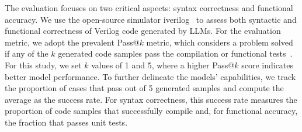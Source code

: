 The evaluation focuses on two critical aspects: syntax correctness and functional accuracy. We use the open-source simulator iverilog~\citep{williams2002icarus} to assess both syntactic and functional correctness of Verilog code generated by LLMs. 
For the evaluation metric, we adopt the prevalent Pass@$k$ metric, which considers a problem solved if any of the $k$ generated code samples pass the compilation or functional tests~\citep{pei2024betterv}. For this study, we set $k$ values of 1 and 5, where a higher Pass@$k$ score indicates better model performance.
To further delineate the models' capabilities, we track the proportion of cases that pass out of 5 generated samples and compute the average as the success rate. For syntax correctness, this success rate measures the proportion of code samples that successfully compile and, for functional accuracy, the fraction that passes unit tests.






